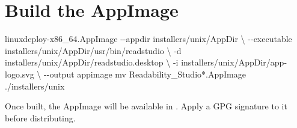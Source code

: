 \documentclass[
  letterpaper,
]{LegrandOrangeBook}
\newenvironment{Shaded}{\begin{snugshade}}{\end{snugshade}}
\newcommand{\AttributeTok}[1]{\textcolor[rgb]{0.40,0.45,0.13}{#1}}
\newcommand{\DataTypeTok}[1]{\textcolor[rgb]{0.68,0.00,0.00}{#1}}
\newcommand{\ExtensionTok}[1]{\textcolor[rgb]{0.00,0.23,0.31}{#1}}
\newcommand{\FunctionTok}[1]{\textcolor[rgb]{0.28,0.35,0.67}{#1}}
\newcommand{\NormalTok}[1]{\textcolor[rgb]{0.00,0.23,0.31}{#1}}
\newcommand{\PreprocessorTok}[1]{\textcolor[rgb]{0.68,0.00,0.00}{#1}}
\begin{document}
\section*{Build the AppImage}\label{build-the-appimage}


\begin{Shaded}
\begin{Highlighting}[]
\ExtensionTok{linuxdeploy{-}x86\_64.AppImage} \AttributeTok{{-}{-}appdir}\NormalTok{ installers/unix/AppDir }\DataTypeTok{\textbackslash{}}
  \AttributeTok{{-}{-}executable}\NormalTok{ installers/unix/AppDir/usr/bin/readstudio }\DataTypeTok{\textbackslash{}}
  \AttributeTok{{-}d}\NormalTok{ installers/unix/AppDir/readstudio.desktop }\DataTypeTok{\textbackslash{}}
  \AttributeTok{{-}i}\NormalTok{ installers/unix/AppDir/app{-}logo.svg }\DataTypeTok{\textbackslash{}}
  \AttributeTok{{-}{-}output}\NormalTok{ appimage}
\FunctionTok{mv}\NormalTok{ Readability\_Studio}\PreprocessorTok{*}\NormalTok{.AppImage ./installers/unix}
\end{Highlighting}
\end{Shaded}

Once built, the AppImage will be available in
. Apply a GPG signature to it before
distributing.

\backmatter

\begingroup
\printbibliography[title=References,heading=bibintoc]
\endgroup


\printindex

\clearpage{\thispagestyle{empty}\cleardoublepage}

\end{document}

